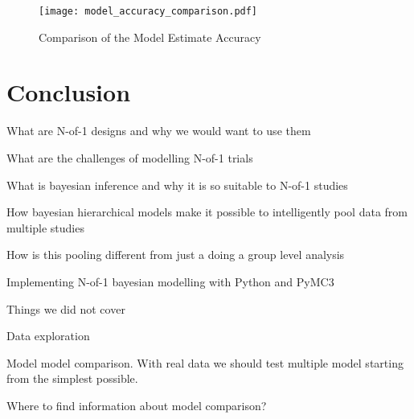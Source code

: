\documentclass[12pt,a4paper,leqno]{report}
\theoremstyle{plain}
\theoremstyle{definition}
\theoremstyle{remark}
\begin{document}
\bigskip
\begin{figure}[H]
    \caption{Comparison of the Model Estimate Accuracy}\label{modelaccuracycomparison}
    \bigskip
    \centering
    \texttt{[image: model\_accuracy\_comparison.pdf]}
\end{figure}
\bigskip



\chapter{Conclusion}


What are N-of-1 designs and why we would want to use them

What are the challenges of modelling N-of-1 trials

What is bayesian inference and why it is so suitable to N-of-1 studies

How bayesian hierarchical models make it possible to intelligently pool data from
multiple studies

How is this pooling different from just a doing a group level analysis

Implementing N-of-1 bayesian modelling with Python and PyMC3

Things we did not cover

Data exploration

Model model comparison. With real data we should test multiple model starting from the
simplest possible.

Where to find information about model comparison?

\end{document}
